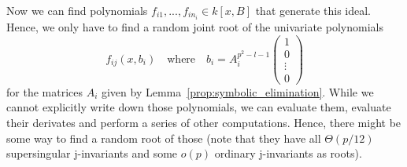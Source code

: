 Now we can find polynomials $f_{i1}, ..., f_{in_i} \in k[x, B]$ that generate this ideal.
Hence, we only have to find a random joint root of the univariate polynomials
\begin{equation*}
    f_{ij}(x, b_i) \quad \text{where} \quad b_i = A_i^{p^2 - l - 1} \left(\begin{matrix*}
        1 \\
        0 \\
        \vdots \\
        0
    \end{matrix*}\right)
\end{equation*}
for the matrices $A_i$ given by Lemma~\ref{prop:symbolic_elimination}.
While we cannot explicitly write down those polynomials, we can evaluate them, evaluate their derivates and perform a series of other computations.
Hence, there might be some way to find a random root of those (note that they have all $\Theta(p/12)$ supersingular j-invariants and some $o(p)$ ordinary j-invariants as roots).